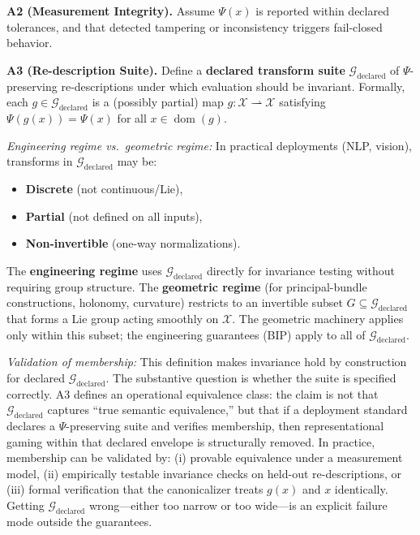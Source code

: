 \documentclass[12pt]{article}
\begin{document}
\textbf{A2 (Measurement Integrity).} Assume $\Psi(x)$ is reported within declared tolerances, and that
detected tampering or inconsistency triggers fail-closed behavior.

\textbf{A3 (Re-description Suite).} Define a \textbf{declared transform suite} $\mathcal{G}_{\text{declared}}$ of $\Psi$-preserving re-descriptions under which evaluation should be invariant. Formally, each $g \in \mathcal{G}_{\text{declared}}$ is a (possibly
partial) map $g : \mathcal{X} \rightharpoonup \mathcal{X}$ satisfying $\Psi(g(x)) = \Psi(x)$ for all $x \in \operatorname{dom}(g)$.

\emph{Engineering regime vs.\ geometric regime:} In practical deployments (NLP, vision), transforms
in $\mathcal{G}_{\text{declared}}$ may be:
\begin{itemize}
\item \textbf{Discrete} (not continuous/Lie),
\item \textbf{Partial} (not defined on all inputs),
\item \textbf{Non-invertible} (one-way normalizations).
\end{itemize}

The \textbf{engineering regime} uses $\mathcal{G}_{\text{declared}}$ directly for invariance testing without requiring group
structure. The \textbf{geometric regime} (for principal-bundle constructions, holonomy, curvature) restricts to an invertible subset $G \subseteq \mathcal{G}_{\text{declared}}$ that forms a Lie group acting smoothly on $\mathcal{X}$. The
geometric machinery applies only within this subset; the engineering guarantees (BIP) apply to all
of $\mathcal{G}_{\text{declared}}$.

\emph{Validation of membership:} This definition makes invariance hold by construction for declared
$\mathcal{G}_{\text{declared}}$. The substantive question is whether the suite is specified correctly. A3 defines an operational equivalence class: the claim is not that $\mathcal{G}_{\text{declared}}$ captures ``true semantic equivalence,'' but
that if a deployment standard declares a $\Psi$-preserving suite and verifies membership, then representational gaming within that declared envelope is structurally removed. In practice, membership
can be validated by: (i) provable equivalence under a measurement model, (ii) empirically testable
invariance checks on held-out re-descriptions, or (iii) formal verification that the canonicalizer treats
$g(x)$ and $x$ identically. Getting $\mathcal{G}_{\text{declared}}$ wrong---either too narrow or too wide---is an explicit failure
mode outside the guarantees.
\end{document}
